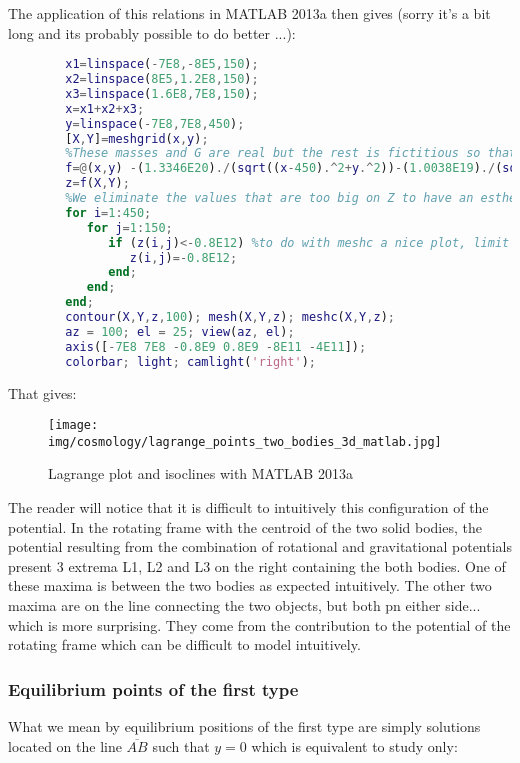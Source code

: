 	The application of this relations in MATLAB 2013a then gives (sorry it's a bit long and its probably possible to do better ...):
	\begin{lstlisting}[language=MATLAB]
		%We build the grid plot that we will by anticipation densifiate where are the objects of interest
		x1=linspace(-7E8,-8E5,150);
		x2=linspace(8E5,1.2E8,150);
		x3=linspace(1.6E8,7E8,150);
		x=x1+x2+x3;
		y=linspace(-7E8,7E8,450);
		[X,Y]=meshgrid(x,y);
		%These masses and G are real but the rest is fictitious so that the plot is readable 
		f=@(x,y) -(1.3346E20)./(sqrt((x-450).^2+y.^2))-(1.0038E19)./(sqrt((x-449999550).^2+y.^2))-(6.9E-7.*(x.^2+y.^2));
		z=f(X,Y);
		%We eliminate the values that are too big on Z to have an esthetical result to see
		for i=1:450;
		   for j=1:150;
		      if (z(i,j)<-0.8E12) %to do with meshc a nice plot, limit to  -8E11
		         z(i,j)=-0.8E12;
		      end; 
		   end; 
		end; 
		contour(X,Y,z,100); mesh(X,Y,z); meshc(X,Y,z); 
		az = 100; el = 25; view(az, el);
		axis([-7E8 7E8 -0.8E9 0.8E9 -8E11 -4E11]);
		colorbar; light; camlight('right');
	\end{lstlisting}
	That gives:
	\begin{figure}[H]
		\begin{center}
		\texttt{[image: img/cosmology/lagrange\_points\_two\_bodies\_3d\_matlab.jpg]}
		\end{center}	
		\caption{Lagrange plot and isoclines with MATLAB 2013a}
	\end{figure}
	The reader will notice that it is difficult to intuitively this configuration of the potential. In the rotating frame with the centroid of the two solid bodies, the potential resulting from the combination of rotational and gravitational potentials present 3 extrema L1, L2 and L3 on the right containing the both bodies. One of these maxima is between the two bodies as expected intuitively. The other two maxima are on the line connecting the two objects, but both pn either side... which is more surprising. They come from the contribution to the potential of the rotating frame which can be difficult to model intuitively.
	
	\subsubsection{Equilibrium points of the first type}
	What we mean by equilibrium positions of the first type are simply solutions located on the line $\overline{AB}$ such that $y=0$ which is equivalent to study only:
	
